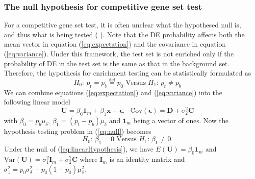 \documentclass[useAMS,usenatbib, galley]{biom}
\begin{document}
	\subsubsection*{The null hypothesis for competitive gene set test}\label{subsubsection:nullhypothesis}
	For a competitive gene set test, it is often unclear what the hypothesed null is, and thus what is being tested (\cite{barry2008statistical}  \citealp{wu2012camera}). Note that the DE probability affects both the mean vector in equation (\ref{eq:expectation}) and the covariance in equation (\ref{eq:variance}). Under this framework, the test set is not enriched only if the probability of DE in the test set is the same as that in the background set. Therefore, the hypothesis for enrichment testing can be statistically formulated as
	\begin{equation}\label{eq:null}
	H_0\text{: }  p_t = p_b \stackrel{\text{def}}{=}p_0  \text{ Versus } H_1 \text{: } p_t \neq p_b
	\end{equation}
	We can combine equations (\ref{eq:expectation}) and (\ref{eq:variance}) into the following linear model
	\begin{equation}\label{eq:linearModel}
	\bm U = \beta_0\bm 1_m + \beta_1\bm x + \bm \epsilon, \text{~~Cov}(\bm \epsilon) =  \bm D  + \sigma_2^2\bm C
	\end{equation} 
	with $ \beta_0 = p_b\mu_{\delta}, ~\beta_1 = (p_t-p_b)\mu_{\delta}$ and $\bm 1_m$ being a vector of ones. Now the hypothesis testing problem in (\ref{eq:null}) becomes 
	\begin{equation}\label{eq:linearHypothesis}
	H_0\text{: }  \beta_1 = 0   \text{ Versus } H_1 \text{: } \beta_1 \neq 0.
	\end{equation}
	Under the null of (\ref{eq:linearHypothesis}), we have $E(\bm U) = \beta_0\bm 1_m$ and $\text{Var}(\bm U) = \sigma^2_1\bm I_m + \sigma_2^2 \bm C$ where $\bm I_m$ is an identity matrix and $\sigma_1^2 = p_0\sigma^2_{\delta}+ p_0(1-p_0)\mu^2_{\delta}$.
	
\end{document}
